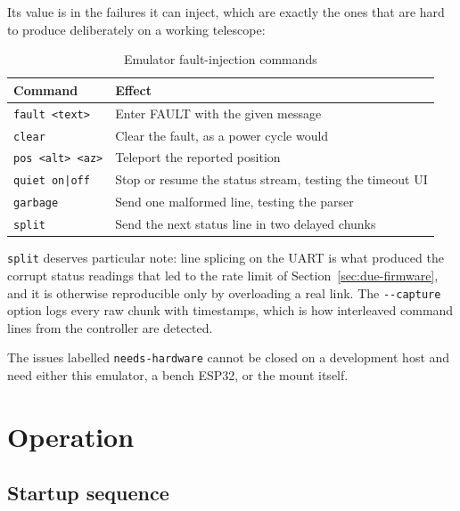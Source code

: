 \documentclass[11pt,a4paper]{article}
\begin{document}
Its value is in the failures it can inject, which are exactly the ones that are hard to produce deliberately on a working telescope:

\begin{table}[H]
\centering
\caption{Emulator fault-injection commands}
\begin{tabular}{ll}
\toprule
\textbf{Command} & \textbf{Effect} \\
\midrule
\texttt{fault <text>} & Enter FAULT with the given message \\
\texttt{clear} & Clear the fault, as a power cycle would \\
\texttt{pos <alt> <az>} & Teleport the reported position \\
\texttt{quiet on|off} & Stop or resume the status stream, testing the timeout UI \\
\texttt{garbage} & Send one malformed line, testing the parser \\
\texttt{split} & Send the next status line in two delayed chunks \\
\bottomrule
\end{tabular}
\end{table}

\texttt{split} deserves particular note: line splicing on the UART is what produced the corrupt status readings that led to the rate limit of Section~\ref{sec:due-firmware}, and it is otherwise reproducible only by overloading a real link. The \texttt{-{}-capture} option logs every raw chunk with timestamps, which is how interleaved command lines from the controller are detected.

The issues labelled \texttt{needs-hardware} cannot be closed on a development host and need either this emulator, a bench ESP32, or the mount itself.

\section{Operation}
\label{sec:operation}

\subsection{Startup sequence}
\end{document}
